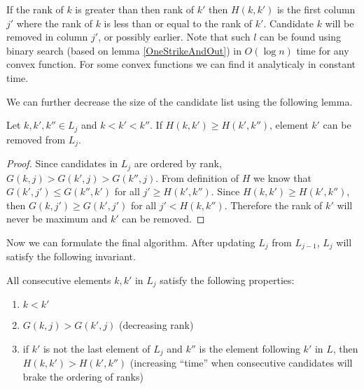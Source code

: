 If the rank of $k$ is greater than then rank of $k'$ then $H(k,k')$ is the first
column $j'$
 where the rank of $k$ is less than or equal to the
rank of $k'$. Candidate $k$ will be removed in column $j'$, or possibly earlier.  Note that
such $l$ can be found using binary search (based on lemma \ref{OneStrikeAndOut})
in $O(\log n)$ time for any convex function. For some convex functions we can
find it analyticaly in constant time.


We can further decrease the size of the candidate list using the following
lemma.

\begin{lemma}\label{TimeLemma}
Let $k,k',k''\in L_j$ and $k<k'<k''$. If $H(k,k')\geq H(k',k'')$, element $k'$ can be
removed from $L_j$.
\end{lemma}

\begin{proof}
Since candidates in $L_j$ are ordered by rank, $G(k,j)>G(k',j)>G(k'',j)$.
From definition of $H$ we know that 
$G(k',j')\leq G(k'',k')$ for  all $j'\geq H(k',k'')$. Since
$H(k,k')\geq H(k',k'')$, then $G(k,j')\geq G(k',j')$ for all $j'<H(k,k'')$.
Therefore the rank
of $k'$ will never be maximum and $k'$ can be removed.

\end{proof}

Now we can formulate the final algorithm. After updating $L_j$ from $L_{j-1}$,
$L_j$ will satisfy the following invariant.
\begin{invariant}\label{LogGapInvariant}
All consecutive elements $k,k'$ in $L_j$ satisfy the following properties:
\begin{enumerate}
\item $k<k'$
\item $G(k,j)>G(k',j)$ (decreasing rank)
\item if $k'$ is not the last element of $L_j$ and $k''$ is the element
following $k'$
in $L$, then $H(k,k')> H(k',k'')$ (increasing ``time'' when consecutive
candidates will brake the ordering of ranks)
\end{enumerate}
\end{invariant}

